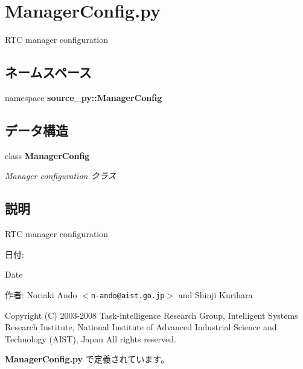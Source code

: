 \section{ManagerConfig.py}
\label{_manager_config_8py}
RTC manager configuration 

\subsection*{ネームスペース}
\begin{CompactItemize}
\item 
namespace \textbf{source\_\-py::ManagerConfig}
\end{CompactItemize}
\subsection*{データ構造}
\begin{CompactItemize}
\item 
class {\bf ManagerConfig}
\begin{CompactList}\small\item\em Manager configuration クラス \item\end{CompactList}\end{CompactItemize}


\subsection{説明}
RTC manager configuration 

\begin{Desc}
\item[日付:]\end{Desc}
\begin{Desc}
\item[Date]\end{Desc}
\begin{Desc}
\item[作者:]Noriaki Ando $<${\tt n-ando@aist.go.jp}$>$ and Shinji Kurihara\end{Desc}
Copyright (C) 2003-2008 Task-intelligence Research Group, Intelligent Systems Research Institute, National Institute of Advanced Industrial Science and Technology (AIST), Japan All rights reserved. 

 {\bf ManagerConfig.py} で定義されています。